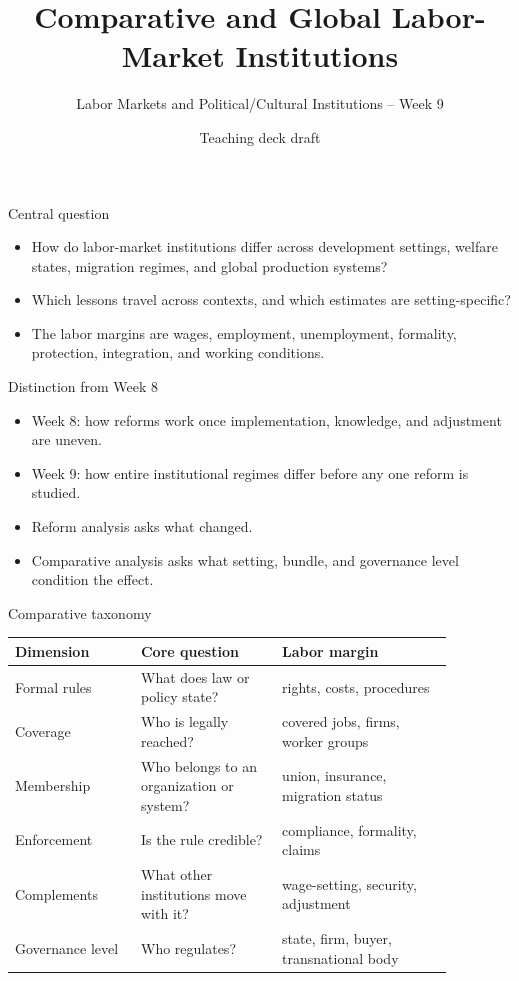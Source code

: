 \documentclass[aspectratio=169,11pt]{beamer}
\title{Comparative and Global Labor-Market Institutions}
\subtitle{Labor Markets and Political/Cultural Institutions -- Week 9}
\author{Teaching deck draft}
\date{}
\begin{document}
\begin{frame}
  \titlepage
\end{frame}

\begin{frame}{Central question}
\begin{itemize}
    \item How do labor-market institutions differ across development settings, welfare states, migration regimes, and global production systems?
    \item Which lessons travel across contexts, and which estimates are setting-specific?
    \item The labor margins are wages, employment, unemployment, formality, protection, integration, and working conditions.
\end{itemize}
\end{frame}

\begin{frame}{Distinction from Week 8}
\begin{itemize}
    \item Week 8: how reforms work once implementation, knowledge, and adjustment are uneven.
    \item Week 9: how entire institutional regimes differ before any one reform is studied.
    \item Reform analysis asks what changed.
    \item Comparative analysis asks what setting, bundle, and governance level condition the effect.
\end{itemize}
\end{frame}

\begin{frame}{Comparative taxonomy}
\small
\begin{tabular}{p{0.25\linewidth} p{0.28\linewidth} p{0.34\linewidth}}
\toprule
Dimension & Core question & Labor margin \\
\midrule
Formal rules & What does law or policy state? & rights, costs, procedures \\
Coverage & Who is legally reached? & covered jobs, firms, worker groups \\
Membership & Who belongs to an organization or system? & union, insurance, migration status \\
Enforcement & Is the rule credible? & compliance, formality, claims \\
Complements & What other institutions move with it? & wage-setting, security, adjustment \\
Governance level & Who regulates? & state, firm, buyer, transnational body \\
\bottomrule
\end{tabular}
\end{frame}
\end{document}
